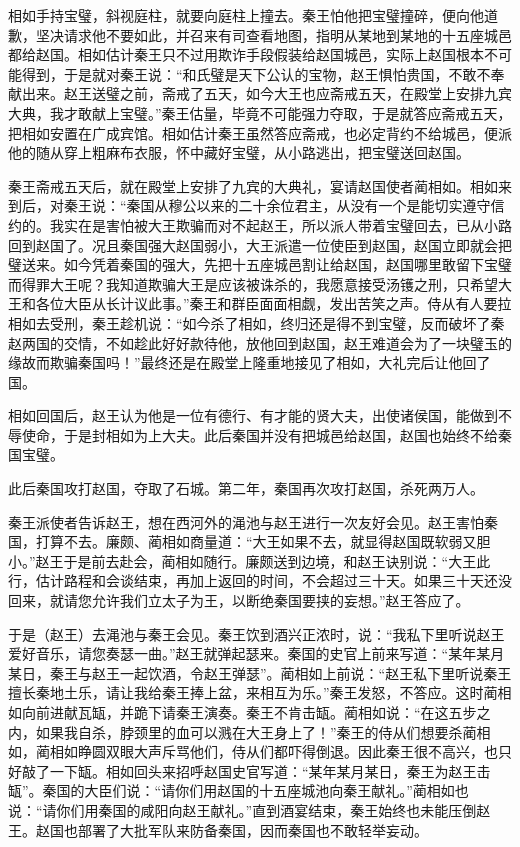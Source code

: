 \documentclass[12pt,UTF-8,openany,a4]{ctexbook}
\begin{document}
\begin{large}
    相如手持宝璧，斜视庭柱，就要向庭柱上撞去。秦王怕他把宝璧撞碎，便向他道歉，坚决请求他不要如此，并召来有司查看地图，指明从某地到某地的十五座城邑都给赵国。相如估计秦王只不过用欺诈手段假装给赵国城邑，实际上赵国根本不可能得到，于是就对秦王说：“和氏璧是天下公认的宝物，赵王惧怕贵国，不敢不奉献出来。赵王送璧之前，斋戒了五天，如今大王也应斋戒五天，在殿堂上安排九宾大典，我才敢献上宝璧。”秦王估量，毕竟不可能强力夺取，于是就答应斋戒五天，把相如安置在广成宾馆。相如估计秦王虽然答应斋戒，也必定背约不给城邑，便派他的随从穿上粗麻布衣服，怀中藏好宝璧，从小路逃出，把宝璧送回赵国。
    
    秦王斋戒五天后，就在殿堂上安排了九宾的大典礼，宴请赵国使者蔺相如。相如来到后，对秦王说：“秦国从穆公以来的二十余位君主，从没有一个是能切实遵守信约的。我实在是害怕被大王欺骗而对不起赵王，所以派人带着宝璧回去，已从小路回到赵国了。况且秦国强大赵国弱小，大王派遣一位使臣到赵国，赵国立即就会把璧送来。如今凭着秦国的强大，先把十五座城邑割让给赵国，赵国哪里敢留下宝璧而得罪大王呢？我知道欺骗大王是应该被诛杀的，我愿意接受汤镬之刑，只希望大王和各位大臣从长计议此事。”秦王和群臣面面相觑，发出苦笑之声。侍从有人要拉相如去受刑，秦王趁机说：“如今杀了相如，终归还是得不到宝璧，反而破坏了秦赵两国的交情，不如趁此好好款待他，放他回到赵国，赵王难道会为了一块璧玉的缘故而欺骗秦国吗！”最终还是在殿堂上隆重地接见了相如，大礼完后让他回了国。
    
    相如回国后，赵王认为他是一位有德行、有才能的贤大夫，出使诸侯国，能做到不辱使命，于是封相如为上大夫。此后秦国并没有把城邑给赵国，赵国也始终不给秦国宝璧。
    
    此后秦国攻打赵国，夺取了石城。第二年，秦国再次攻打赵国，杀死两万人。
    
    秦王派使者告诉赵王，想在西河外的渑池与赵王进行一次友好会见。赵王害怕秦国，打算不去。廉颇、蔺相如商量道：“大王如果不去，就显得赵国既软弱又胆小。”赵王于是前去赴会，蔺相如随行。廉颇送到边境，和赵王诀别说：“大王此行，估计路程和会谈结束，再加上返回的时间，不会超过三十天。如果三十天还没回来，就请您允许我们立太子为王，以断绝秦国要挟的妄想。”赵王答应了。
    
    于是（赵王）去渑池与秦王会见。秦王饮到酒兴正浓时，说：“我私下里听说赵王爱好音乐，请您奏瑟一曲。”赵王就弹起瑟来。秦国的史官上前来写道：“某年某月某日，秦王与赵王一起饮酒，令赵王弹瑟”。蔺相如上前说：“赵王私下里听说秦王擅长秦地土乐，请让我给秦王捧上盆，来相互为乐。”秦王发怒，不答应。这时蔺相如向前进献瓦缻，并跪下请秦王演奏。秦王不肯击缻。蔺相如说：“在这五步之内，如果我自杀，脖颈里的血可以溅在大王身上了！”秦王的侍从们想要杀蔺相如，蔺相如睁圆双眼大声斥骂他们，侍从们都吓得倒退。因此秦王很不高兴，也只好敲了一下缻。相如回头来招呼赵国史官写道：“某年某月某日，秦王为赵王击缻”。秦国的大臣们说：“请你们用赵国的十五座城池向秦王献礼。”蔺相如也说：“请你们用秦国的咸阳向赵王献礼。”直到酒宴结束，秦王始终也未能压倒赵王。赵国也部署了大批军队来防备秦国，因而秦国也不敢轻举妄动。
    

\end{large}
\end{document}
